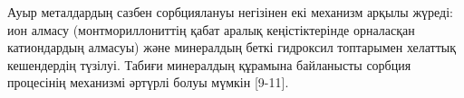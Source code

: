 
Ауыр металдардың сазбен сорбциялануы негізінен екі механизм арқылы
жүреді: ион алмасу (монтмориллониттің қабат аралық кеңістіктерінде
орналасқан катиондардың алмасуы) және минералдың беткі гидроксил
топтарымен хелаттық кешендердің түзілуі. Табиғи минералдың құрамына
байланысты сорбция процесінің механизмі әртүрлі болуы мүмкін {[}9-11{]}.

